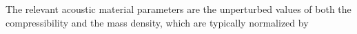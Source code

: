 The relevant acoustic material parameters are
the unperturbed values of both
the compressibility and
the mass density, which are typically normalized by
